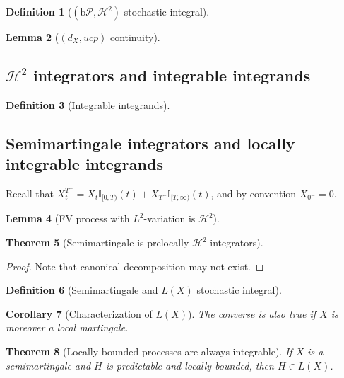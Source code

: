 \documentclass[openany,oneside]{book}
\newtheorem{thm}{Theorem}[section]
\newtheorem{lem}[thm]{Lemma}
\newtheorem{cor}[thm]{Corollary}
\theoremstyle{definition}
\newtheorem{defn}[thm]{Definition}
\theoremstyle{remark}
\newcommand{\I}{\mathbb{I}} %
\newcommand{\sH}[1][2]{\mathcal{H}^{#1}} %
\newcommand{\pred}{\mathcal{P}} %
\newcommand{\bP}{\mathrm{b}\pred} %
\begin{document}
\begin{defn}[$(\bP,\sH)$ stochastic integral]

\end{defn}

\begin{lem}[$(d_X,ucp)$ continuity]

\end{lem}

\subsection{$\sH$ integrators and integrable integrands}
\begin{defn}[Integrable integrands]

\end{defn}


\subsection{Semimartingale integrators and locally integrable integrands}
Recall that $X^{T^-}_t = X_t\I_{[0,T)}(t) + X_{T^-}\I_{[T,\infty)}(t)$, and by convention $X_{0^-}=0$.

\begin{lem}[FV process with $L^2$-variation is $\sH$]

\end{lem}

\begin{thm}[Semimartingale is prelocally $\sH$-integrators]

\end{thm}
\begin{proof}
Note that canonical decomposition may not exist.
\end{proof}

\begin{defn}[Semimartingale and $L(X)$ stochastic integral]

\end{defn}



\begin{cor}[Characterization of $L(X)$]
The converse is also true if $X$ is moreover a local martingale.
\end{cor}

\begin{thm}[Locally bounded processes are always integrable]
If $X$ is a semimartingale and $H$ is predictable and locally bounded, then $H\in L(X)$.
\end{thm}
\end{document}
